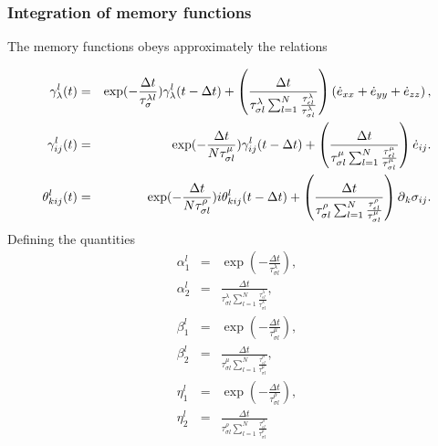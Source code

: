 \documentclass[11pt]{article}
\begin{document}
\subsubsection{Integration of memory functions}
The memory functions  obeys approximately the relations

\begin{eqnarray}
\gamma^l_{\lambda}(t) & = &
            \exp(-\frac{\Delta t}{\tau^{\lambda l}_{\sigma}})
              \gamma^l_{\lambda}(t-\Delta t)
            +\left(\frac{\Delta t}{\tau^{\lambda}_{\sigma l}
            \sum_{l=1}^N\frac{\tau^{\lambda}_{\epsilon l}}
                             {\tau^{\lambda}_{\sigma l}}}\right)
             \left(\dot{e}_{xx}+ \dot{e}_{yy}+\dot{e}_{zz}\right) ,\nonumber\\
\gamma^l_{ij}(t) & = &
            \exp(-\frac{\Delta t}{N\tau^{\mu}_{\sigma l}})
              \gamma^l_{ij}(t-\Delta t)
            + \left(\frac{\Delta t}{\tau^{\mu}_{\sigma l}
            \sum_{l=1}^N\frac{\tau^{\mu}_{\epsilon l}}{\tau^{\mu}_{\sigma l}}}
            \right) \dot{e}_{ij}.\nonumber\\
\theta^l_{kij}(t) & = &
            \exp(-\frac{\Delta t}{N\tau^{\rho}_{\sigma l}})i
              \theta^l_{kij}(t-\Delta t)
            + \left(\frac{\Delta t}{\tau^{\rho}_{\sigma l}
            \sum_{l=1}^N\frac{\tau^{\rho}_{\epsilon l}}{\tau^{\mu}_{\sigma l}}}
            \right) \mbox{$\partial$}_k \sigma_{ij}.\nonumber\\
\end{eqnarray}
%
Defining the quantities
\begin{eqnarray}
\alpha^l_1 & = & \exp(-\frac{\Delta t}{\tau^{\lambda}_{\sigma l}}),\\
\alpha^l_2 & = & \frac{\Delta t}{\tau^{\lambda}_{\sigma l}
                 \sum_{l=1}^N\frac{\tau^{\lambda}_{\epsilon l}}
                                  {\tau^{\lambda}_{\sigma l}}} ,\\
\beta^l_1  & = &\exp(-\frac{\Delta t}{\tau^{\mu}_{\sigma l}}) ,\\
\beta^l_2  & = &\frac{\Delta t}{\tau^{\mu}_{\sigma l}\sum_{l=1}^N
                \frac{\tau^{\mu}_{\epsilon l}}{\tau^{\mu}_{\sigma l}}},\\
\eta^l_1  & = &\exp(-\frac{\Delta t}{\tau^{\rho}_{\sigma l}}) ,\\
\eta^l_2  & = &\frac{\Delta t}{\tau^{\rho}_{\sigma l}\sum_{l=1}^N
               \frac{\tau^{\rho}_{\epsilon l}}{\tau^{\rho}_{\sigma l}}} 
\end{eqnarray}
\end{document}

